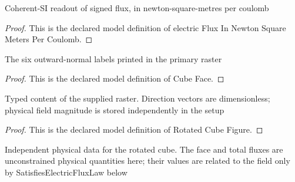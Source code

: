\begin{definition}
  \label{def:physics:phyx-mini-0999:phyxminiproblems-problemphyxmini0999-electricfluxinnewtonsquaremeterspercoulomb}
  Coherent-SI readout of signed flux, in newton-square-metres per coulomb
\end{definition}
\begin{proof}
  This is the declared model definition of electric Flux In Newton Square Meters Per Coulomb.
\end{proof}
\begin{definition}
  \label{def:physics:phyx-mini-0999:phyxminiproblems-problemphyxmini0999-cubeface}
  The six outward-normal labels printed in the primary raster
\end{definition}
\begin{proof}
  This is the declared model definition of Cube Face.
\end{proof}
\begin{definition}
  \label{def:physics:phyx-mini-0999:phyxminiproblems-problemphyxmini0999-rotatedcubefigure}
  Typed content of the supplied raster. Direction vectors are dimensionless; physical field magnitude is stored independently in the setup
\end{definition}
\begin{proof}
  This is the declared model definition of Rotated Cube Figure.
\end{proof}
\begin{definition}
  \label{def:physics:phyx-mini-0999:phyxminiproblems-problemphyxmini0999-rotatedcubeinuniformfieldsetup}
  Independent physical data for the rotated cube. The face and total fluxes are unconstrained physical quantities here; their values are related to the field only by SatisfiesElectricFluxLaw below
\end{definition}
